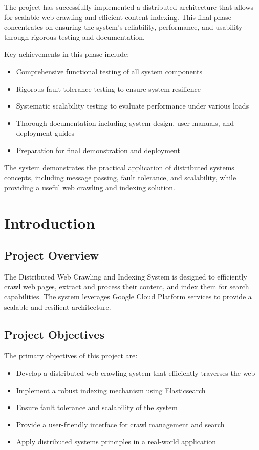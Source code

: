 \documentclass[12pt,a4paper]{report}
\begin{document}
The project has successfully implemented a distributed architecture that allows for scalable web crawling and efficient content indexing. This final phase concentrates on ensuring the system's reliability, performance, and usability through rigorous testing and documentation.

Key achievements in this phase include:
\begin{itemize}
    \item Comprehensive functional testing of all system components
    \item Rigorous fault tolerance testing to ensure system resilience
    \item Systematic scalability testing to evaluate performance under various loads
    \item Thorough documentation including system design, user manuals, and deployment guides
    \item Preparation for final demonstration and deployment
\end{itemize}

The system demonstrates the practical application of distributed systems concepts, including message passing, fault tolerance, and scalability, while providing a useful web crawling and indexing solution.

\chapter{Introduction}

\section{Project Overview}
The Distributed Web Crawling and Indexing System is designed to efficiently crawl web pages, extract and process their content, and index them for search capabilities. The system leverages Google Cloud Platform services to provide a scalable and resilient architecture.

\section{Project Objectives}
The primary objectives of this project are:
\begin{itemize}
    \item Develop a distributed web crawling system that efficiently traverses the web
    \item Implement a robust indexing mechanism using Elasticsearch
    \item Ensure fault tolerance and scalability of the system
    \item Provide a user-friendly interface for crawl management and search
    \item Apply distributed systems principles in a real-world application
\end{itemize}
\end{document}
